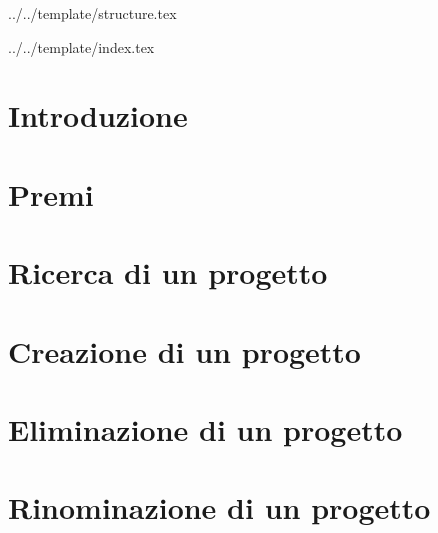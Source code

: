 

\def\DOCUMENTO{Manuale Utente}
\def\VERSIONE{2.0.0}

\def\DESCRIZIONE{Documento che facilita l'utilizzo dell'applicazione da parte dell'utente.}

\def\REDATTORE {Suierica Bogdan}
\def\VERIFICATORE {Ros Fabio}
\def\RESPONSABILE {Agostinetto Matteo}

\def\USO {Esterno}

\def\DISTRIBUZIONE {\GRUPPO{}\\ & \COMMITTENTE{}\\ & \PROPONENTE{}\\}


\def\INDICE	{true}
\def\TABELLE {true}
\def\FIGURE {true}


 {../../template/structure.tex}



 {../../template/index.tex}

\section{Introduzione}

\newpage

\section{Premi}

\newpage

\section{Ricerca di un progetto}

\newpage

\section{Creazione di un progetto}


\section{Eliminazione di un progetto}


\section{Rinominazione di un progetto}


